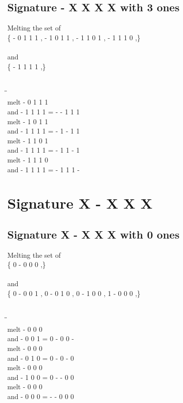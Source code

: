 \documentclass{article}
\begin{document}
\subsection{Signature - X X X X with 3 ones}
Melting the set of\\
\{ -  0  1  1  1 , -  1  0  1  1 , -  1  1  0  1 , -  1  1  1  0 ,\}\\\\
and\\
\{ -  1  1  1  1 ,\}\\\\
\begin{tabbing}
\hspace{3cm}\=\hspace{3cm}\=\hspace{3cm}\\[1cm]
melt\> -  0  1  1  1 \\
and\> -  1  1  1  1 \>
 =  -  -  1  1  1 \\[1mm]
melt\> -  1  0  1  1 \\
and\> -  1  1  1  1 \>
 =  -  1  -  1  1 \\[1mm]
melt\> -  1  1  0  1 \\
and\> -  1  1  1  1 \>
 =  -  1  1  -  1 \\[1mm]
melt\> -  1  1  1  0 \\
and\> -  1  1  1  1 \>
 =  -  1  1  1  - \\[1mm]
\end{tabbing}
\newpage
\section{Signature X - X X X }
\subsection{Signature X - X X X with 0 ones}
Melting the set of\\
\{ 0  -  0  0  0 ,\}\\\\
and\\
\{ 0  -  0  0  1 , 0  -  0  1  0 , 0  -  1  0  0 , 1  -  0  0  0 ,\}\\\\
\begin{tabbing}
\hspace{3cm}\=\hspace{3cm}\=\hspace{3cm}\\[1cm]
melt  -  0  0  0 \\
and  -  0  0  1 \>
 =  0  -  0  0  - \\[1mm]
melt  -  0  0  0 \\
and  -  0  1  0 \>
 =  0  -  0  -  0 \\[1mm]
melt  -  0  0  0 \\
and  -  1  0  0 \>
 =  0  -  -  0  0 \\[1mm]
melt  -  0  0  0 \\
and  -  0  0  0 \>
 =  -  -  0  0  0 \\[1mm]
\end{tabbing}
\newpage
\end{document}
